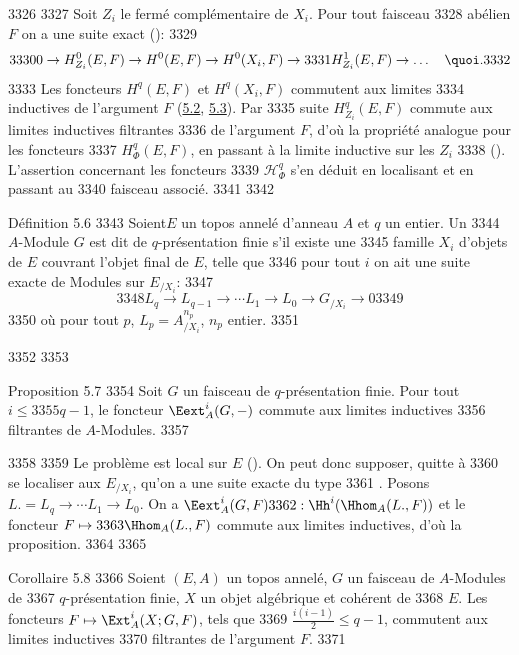   3326	
  3327	Soit $Z_i$ le fermé complémentaire de $X_i$. Pour tout faisceau
  3328	abélien $F$ on a une suite exact ():
  3329	$$
  3330	0 \to H^{0}_{Z_i} (E, F) \to H^{0} (E, F) \to H^{0} (X_i, F) \to
  3331	H^{1}_{Z_i} (E, F) \to \ldots\quad {\quoi}.
  3332	$$
  3333	Les foncteurs $H^q(E, F)$ et $H^q(X_i, F)$ commutent aux limites
  3334	inductives de l'argument $F$ (\hyperref[VI.cor5.2]{5.2}, \hyperref[VI.cor5.3]{5.3}). Par
  3335	suite $H^q_{Z_i} (E, F)$ commute aux limites inductives filtrantes
  3336	de l'argument $F$, d'où la propriété analogue pour les foncteurs
  3337	$H^q_{\Phi}(E, F)$, en passant à la limite inductive sur les $Z_i$
  3338	(). L'assertion concernant les foncteurs
  3339	$ℋ^q_{\Phi}$ s'en déduit en localisant et en passant au
  3340	faisceau associé.
  3341	
  3342	\begin{enonce*}[remark]{Définition 5.6}
  3343	Soient\pageoriginale $E$ un topos annelé d'anneau $A$ et $q$ un entier. Un
  3344	$A$-Module $G$ est dit de $q$-présentation finie s'il existe une
  3345	famille $X_i$ d'objets de $E$ couvrant l'objet final de $E$, telle que
  3346	pour tout $i$ on ait une suite exacte de Modules sur $E_{/X_i}$:
  3347	\begin{equation*}
  3348	L_q \to L_{q-1} \to \cdots L_1 \to L_0 \to G_{/X_i} \to 0\tag{5.5.1}
  3349	\end{equation*}
  3350	où pour tout $p$, $L_p = A^{n_p}_{/X_i}$, $n_p$ entier.
  3351	\end{enonce*}
  3352	
  3353	\begin{enonce*}{Proposition 5.7}
  3354	Soit $G$ un faisceau de $q$-présentation finie. Pour tout $i \leq
  3355	q-1$, le foncteur $\Eext^i_A (G, -)$ commute aux limites inductives
  3356	filtrantes de $A$-Modules.
  3357	\end{enonce*}
  3358	
  3359	Le problème est local sur $E$ (). On peut donc supposer, quitte à
  3360	se localiser aux $E_{/X_i}$, qu'on a une suite exacte du type
  3361	. Posons $L. = L_q \to \cdots L_1 \to L_0$. On a $\Eext^{i}_A(G, F)
  3362	: \Hh^{i} (\Hhom_A(L., F))$ et le foncteur $F \mapsto
  3363	\Hhom_A (L., F)$ commute aux limites inductives, d'où la proposition.
  3364	
  3365	\begin{enonce*}{Corollaire 5.8}
  3366	Soient $(E, A)$ un topos annelé, $G$ un faisceau de $A$-Modules de
  3367	$q$-présentation finie, $X$ un objet algébrique et cohérent de
  3368	$E$. Les foncteurs $F \mapsto \Ext^{i}_A (X; G, F)$, tels que
  3369	$\frac{i(i-1)}{2} \leq q-1$, commutent aux limites inductives
  3370	filtrantes de l'argument $F$.
  3371	\end{enonce*}
